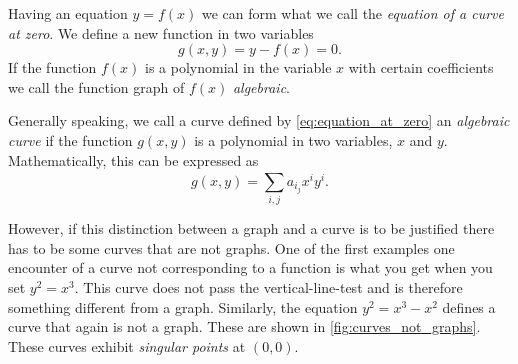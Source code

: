 \documentclass[a4paper]{article}
\theoremstyle{definition}
\theoremstyle{plain}
\begin{document}
    Having an equation $y = f(x)$ we can form what we call the \emph{equation
    of a curve at zero}. We define a new function in two variables
    \begin{equation}
        \label{eq:equation_at_zero}
        g(x, y) = y - f(x) = 0.
    \end{equation}
    If the function $f(x)$ is a polynomial in the variable $x$ with certain
    coefficients we call the function graph of $f(x)$ \emph{algebraic}.

    Generally speaking, we call a curve defined by \cref{eq:equation_at_zero}
    an \emph{algebraic curve} if the function $g(x, y)$ is a polynomial in two
    variables, $x$ and $y$. Mathematically, this can be expressed as
    \begin{equation}
        \label{eq:algebraic_curve}
        g(x, y) = \sum^{}_{i, j} a_{i_j}x^{i}y^{i}.
    \end{equation}
    
    However, if this distinction between a graph and a curve is to be justified
    there has to be some curves that are not graphs. One of the first examples
    one encounter of a curve not corresponding to a function is what you get
    when you set $y^2 = x^3$. This curve does not pass the vertical-line-test
    and is therefore something different from a graph. Similarly, the equation
    $y^2 = x^3 - x^2$ defines a curve that again is not a graph. These are
    shown in \cref{fig:curves_not_graphs}. These curves exhibit \emph{singular
    points} at $(0, 0)$. 
    
\end{document}
